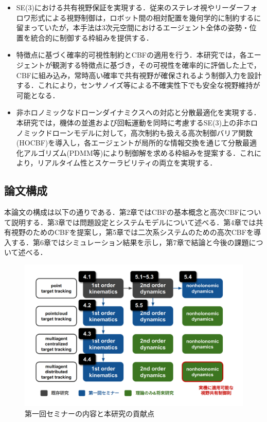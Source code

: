 \begin{itemize}
\item SE(3)における共有視野保証を実現する．従来のステレオ視やリーダーフォロワ形式による視野制御は，ロボット間の相対配置を幾何学的に制約するに留まっていたが，本手法は3次元空間におけるエージェント全体の姿勢・位置を統合的に制御する枠組みを提供する．

\item 特徴点に基づく確率的可視性制約とCBFの適用を行う．本研究では，各エージェントが観測する特徴点に基づき，その可視性を確率的に評価した上で，CBFに組み込み，常時高い確率で共有視野が確保されるよう制御入力を設計する．これにより，センサノイズ等による不確実性下でも安全な視野維持が可能となる．

\item 非ホロノミックなドローンダイナミクスへの対応と分散最適化を実現する．本研究では，機体の並進および回転運動を同時に考慮するSE(3)上の非ホロノミックドローンモデルに対して，高次制約も扱える高次制御バリア関数(HOCBF)を導入し，各エージェントが局所的な情報交換を通じて分散最適化アルゴリズム(PDMM等)により制御解を求める枠組みを提案する\cite{Lv2024}．これにより，リアルタイム性とスケーラビリティの両立を実現する．
\end{itemize}

\subsection{論文構成}

本論文の構成は以下の通りである．第2章ではCBFの基本概念と高次CBFについて説明する．第3章では問題設定とシステムモデルについて述べる．第4章では共有視野のためのCBFを提案し，第5章では二次系システムのための高次CBFを導入する．第6章ではシミュレーション結果を示し，第7章で結論と今後の課題について述べる．

\begin{figure}[htbp]
\centering
\includegraphics[width=0.8\linewidth]{fig/progress.png}
\caption{第一回セミナーの内容と本研究の貢献点}
\label{fig:progress}
\end{figure}